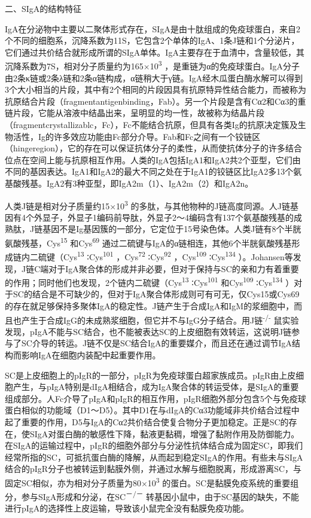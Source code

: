 \begin{center}
{\large 二、SIgA的结构特征}
\end{center}
IgA在分泌物中主要以二聚体形式存在，SIgA是由十肽组成的免疫球蛋白，来自2个不同的细胞系，沉降系数为11S，它包含2个单体的IgA、1条J链和1个分泌片，它们通过共价结合就形成所谓的SIgA单体。IgA主要存在于血清中，含量较低，其沉降系数为7S，相对分子质量约为165×10\textsuperscript{3}
，是重链为α的免疫球蛋白。IgA分子由2条κ链或2条λ链和2条α链构成，α链稍大于γ链。IgA经木瓜蛋白酶水解可以得到3个大小相当的片段，其中有2个相同的片段因具有抗原特异性结合能力，而被称为抗原结合片段（fragmentantigenbinding，Fab）。另一个片段是含有Cα2和Cα3的重链片段，它能从溶液中结晶出来，呈明显的均一性，故被称为结晶片段（fragmentcrystallizablc，Fc），Fc不能结合抗原，但具有各类Ig的抗原决定簇及生物活性，Ig的许多效应功能由Fc部分介导。Fab和Fc之间有一个铰链区（hingeregion），它的存在可以保证抗体分子的柔性，从而使抗体分子的许多结合位点在空间上能与抗原相互作用。人类的IgA包括IgA1和IgA2共2个亚型，它们由不同的基因表达。IgA1和IgA2的最大不同之处在于IgA1的铰链区比IgA2多13个氨基酸残基。IgA2有3种亚型，即IgA2m（1）、IgA2m（2）和IgA2n。

人类J链是相对分子质量约15×10\textsuperscript{3}
的多肽，与其他物种的J链高度同源。人J链基因有4个外显子，外显子1编码前导肽，外显子2～4编码含有137个氨基酸残基的成熟肽，J链基因不是Ig基因簇的一部分，它定位于15号染色体。人类J链有8个半胱氨酸残基，Cys\textsuperscript{15}
和Cys\textsuperscript{69}
通过二硫键与IgA的α链相连，其他6个半胱氨酸残基形成链内二硫键（Cys\textsuperscript{13}
∶Cys\textsuperscript{101} ，Cys\textsuperscript{72}
∶Cys\textsuperscript{92} ，Cys\textsuperscript{109}
∶Cys\textsuperscript{134}
）。Johansen等发现，J链C端对于IgA聚合体的形成并非必要，但对于保持与SC的亲和力有着重要的作用；同时他们也发现，2个链内二硫键（Cys\textsuperscript{13}
∶Cys\textsuperscript{101} 和Cys\textsuperscript{109}
∶Cys\textsuperscript{134}
）对于SC的结合是不可缺少的，但对于IgA聚合体形成则可有可无，仅Cys15或Cys69的存在就足够保持多聚体IgA的稳定性。J链产生于合成IgA和IgM的浆细胞中，而且也产生于合成IgG的未成熟浆细胞，但它并不与IgG分子结合。用J链\textsuperscript{-/-}
鼠实验发现，pIgA不能与SC结合，也不能被表达SC的上皮细胞有效转运，这说明J链参与了SC介导的转运。J链不仅是SC结合IgA的重要媒介，而且还在通过调节IgA结构而影响IgA在细胞内装配中起重要作用。

SC是上皮细胞上的pIgR的一部分，pIgR为免疫球蛋白超家族成员。pIgR由上皮细胞产生，与pIgA特别是dIgA相结合，成为IgA聚合体的转运受体，是SIgA的重要组成部分。人Fc介导了pIgA和pIgR的相互作用，pIgR细胞外部分包含5个与免疫球蛋白相似的功能域（D1～D5）。其中D1在与dIgA的Cα3功能域非共价结合过程中起了重要的作用，D5与IgA的Cα2共价结合使复合物分子更加稳定。正是SC的存在，使SIgA对蛋白酶的敏感性下降，黏液更黏稠，增强了黏附作用及防御能力。在SIgA的运输过程中，pIgR的细胞外部分与分泌性抗体结合成为固定SC，即我们经常所指的SC，可抵抗蛋白酶的降解，从而起到稳定SIgA的作用。有些未与SIgA结合的pIgR分子也被转运到黏膜外侧，并通过水解与细胞脱离，形成游离SC，与固定SC相似，亦为相对分子质量为80×10\textsuperscript{3}
的蛋白。SC是黏膜免疫系统的重要组分，参与SIgA形成和分泌，在SC\textsuperscript{－/－}
转基因小鼠中，由于SC基因的缺失，不能进行pIgA的选择性上皮运输，导致该小鼠完全没有黏膜免疫功能。

